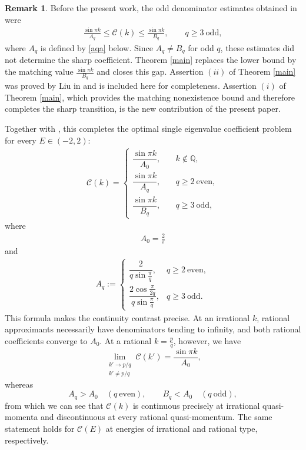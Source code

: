 \documentclass[12pt]{amsart}
\theoremstyle{plain}
\theoremstyle{definition}
\newtheorem{remark}[theorem]{Remark}
\begin{document}
{\begin{remark}
Before the present work, the odd denominator estimates obtained in \cite{LiuDiscrete} were
\begin{align}
\frac{\sin\pi k}{A_q}
\leq \mathcal C(k)
\leq
\frac{\sin\pi k}{B_q},
\qquad q\geq3\ \text{odd},
\nonumber
\end{align}
where $A_q$ is defined by \eqref{aqa} below.
Since $A_q\neq B_q$ for odd $q$, these estimates did not determine the sharp coefficient. Theorem \ref{main} replaces the lower bound by the matching value $\frac{\sin\pi k}{B_q}$ and closes this gap.
Assertion $(ii)$ of Theorem \ref{main} was proved by Liu in \cite{LiuDiscrete} and is included here for completeness. Assertion $(i)$ of Theorem \ref{main}, which provides the matching nonexistence bound and therefore completes the sharp transition, is the new contribution of the present paper.
\end{remark}

Together with \cite{LiuDiscrete}, this completes the optimal
single eigenvalue coefficient problem for every $E\in(-2,2)$: 
\begin{align}
	\mathcal C(k)=
	\begin{cases}
		\dfrac{\sin\pi k}{A_0},
		& \quad k\notin\mathbb Q,\\[12pt]
		\dfrac{\sin\pi k}{A_q},
		& \quad q\geq2\ \text{even},\\[12pt]
		\dfrac{\sin\pi k}{B_q},
		& \quad q\geq3\ \text{odd},
	\end{cases}
	\label{demck}
\end{align}
where
\begin{align}\label{da0}
	A_0=\frac{2}{\pi}
\end{align}
and
\begin{align}\label{aqa}
	A_q:=
	\begin{cases}
		\dfrac{2}{q\sin\frac{\pi}{q}},
		& q\geq2\ \text{even},\\[15pt]
		\dfrac{2\cos\frac{\pi}{2q}}{q\sin\frac{\pi}{q}},
		& q\geq3\ \text{odd}.
	\end{cases}
\end{align}
This formula makes the continuity contrast precise. At an irrational
$k$, rational approximants necessarily have denominators tending to
infinity, and both rational coefficients converge to $A_0$. At a
rational $k=\frac{p}{q}$, however, we have
\[
\lim_{\substack{k'\to p/q\\ k'\neq p/q}}\mathcal C(k')
=\frac{\sin\pi k}{A_0},
\]
whereas
\[
A_q>A_0
\quad(q\ \text{even}),
\qquad
B_q<A_0
\quad(q\ \text{odd}),
\]
from which we can see that $\mathcal C(k)$ is continuous precisely at irrational
quasi-momenta and discontinuous at every rational quasi-momentum.
The same statement holds for $\mathcal C(E)$ at energies of
irrational and rational type, respectively.}
\end{document}
